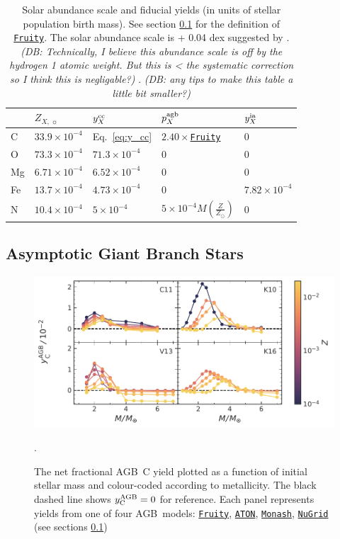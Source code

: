 \documentclass[fleqn,
usenatbib]{mnras}
\newcommand{\fruity}{\texttt{\hyperlink{fruity}{Fruity}}}
\newcommand{\nugrid}{\texttt{\hyperlink{nugrid}{NuGrid}}}
\newcommand{\monash}{\texttt{\hyperlink{monash}{Monash}}}
\newcommand{\aton}{\texttt{\hyperlink{aton}{ATON}}}
\newcommand{\cfactor}{2.40}
\newcommand{\agb}{AGB}
\newcommand{\Ycagb}{{y_{\rm C}^{\rm AGB}}}
\newcommand{\y}{p}
\newcommand{\dbnote}[1]{ {\color{Thistle} \textit{\small (DB: #1)}} }
\begin{document}
\begin{table}
	\centering
    \caption[]{Solar abundance scale and fiducial yields (in units of stellar population birth mass). See section \ref{sec:agb} for the definition of \fruity. The solar abundance scale is \citet{magg+22} + 0.04 dex suggested by \citet{david_fe}.
        \dbnote{Technically, I believe this abundance scale is off by the hydrogen 1 atomic weight. But this is < the systematic correction so I think this is negligable?}.
    \dbnote{any tips to make this table a little bit smaller?}
    }
	\label{tab:fiducial_mod}

	\begin{tabular}{l l l l l}
		\hline
         & $Z_{X,\,\sun}$ & $y_X^{\rm cc}$ & $\y_X^{\rm agb}$ & $y_X^{\rm ia}$  \\
		\hline
        C & $33.9\times10^{-4}$ & Eq.~\ref{eq:y_cc} & $\cfactor\times$\fruity &  0 \\
        O & $73.3\times10^{-4}$ & $71.3\times10^{-4}$ & 0 & 0 \\
        Mg & $6.71\times10^{-4}$ & $6.52\times 10^{-4}$ & 0 & 0 \\
        Fe & $13.7\times10^{-4}$ & $4.73\times10^{-4}$ & 0 & $7.82\times10^{-4}$ \\
        N & $10.4\times10^{-4}$ & $5\times10^{-4}$ & $5\times10^{-4}M\left(\frac{Z}{Z_\odot}\right)$ & 0\\
		\hline
	\end{tabular}
\end{table}


\subsection{Asymptotic Giant Branch Stars}\label{sec:agb}

\begin{figure}
    \centering
 	    \includegraphics[scale=1]{agb_yields.pdf}
        \caption[]{The net fractional \agb\ C yield  plotted as a function of initial stellar mass and colour-coded according to metallicity. The black dashed line shows $\Ycagb=0$ for reference. Each panel represents yields from one of four \agb\ models: \fruity{}, \aton{}, \monash{}, \nugrid{} (see sections \ref{sec:agb}) }.

        \label{fig:y_agb}
\end{figure}
\end{document}
